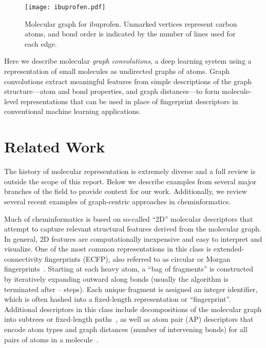 \begin{figure}[tb]
\centering
  \texttt{[image: ibuprofen.pdf]}
  \caption{
    Molecular graph for ibuprofen. Unmarked vertices represent carbon atoms, and
    bond order is indicated by the number of lines used for each edge.
  }
  \label{fig:ibuprofen}
\end{figure}

Here we describe molecular \emph{graph convolutions}, a deep learning
system using a representation of small molecules as undirected graphs of atoms.
Graph convolutions extract meaningful features from simple
descriptions of the graph structure---atom and bond properties, and
graph distances---to form molecule-level representations that can be
used in place of fingerprint descriptors in conventional
machine learning applications.

\section{Related Work}\label{sec:related_work}

The history of molecular representation is extremely diverse
\citep{todeschini2009molecular} and a full review is outside the scope of this
report. Below we describe examples from several major branches of the field to
provide context for our work. Additionally, we review several recent examples of
graph-centric approaches in cheminformatics.

Much of cheminformatics is based on so-called ``2D'' molecular descriptors that
attempt to capture relevant structural features derived from the molecular
graph. In general, 2D features are computationally inexpensive and easy to
interpret and visualize. One of the most common representations in this class is
extended-connectivity fingerprints (ECFP), also referred to as circular or
Morgan fingerprints~\citep{rogers2010extended}. Starting at each heavy atom, a
``bag of fragments'' is constructed by iteratively expanding outward along bonds
(usually the algorithm is terminated after -- steps). Each unique fragment
is assigned an integer identifier, which is often hashed into a fixed-length
representation or ``fingerprint''. Additional descriptors in this class include
decompositions of the molecular graph into subtrees or fixed-length
paths~\citep{oegraphsimtk}, as well as atom pair (AP) descriptors that encode
atom types and graph distances (number of intervening bonds) for all pairs of
atoms in a molecule~\citep{carhart1985atom}.

